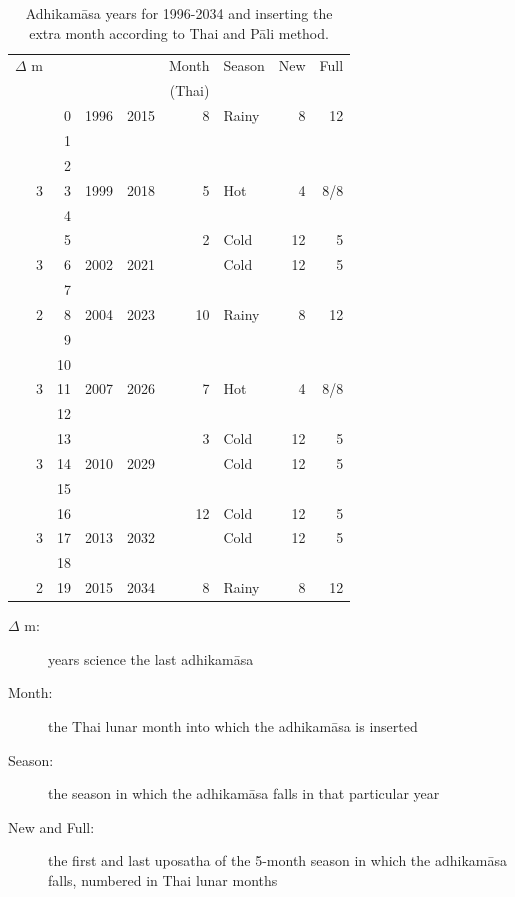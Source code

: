 \documentclass[11pt,oneside]{memoir-article}
\begin{document}
\begin{table}[p]
\caption{\label{tbl-cycle-adhikamasa} Adhikamāsa years for 1996-2034 and inserting the extra month according to Thai and Pāli method.}
\centering
\begin{tabular}{rrrr|rlrr}
$\Delta$ m &  &  &  & Month & Season & New & Full\\
 &  &  &  & (Thai) &  &  & \\
\hline
 & 0 & 1996 & 2015 & 8 & Rainy & 8 & 12\\
 & 1 &  &  &  &  &  & \\
 & 2 &  &  &  &  &  & \\
3 & 3 & 1999 & 2018 & 5 & Hot & 4 & 8/8\\
 & 4 &  &  &  &  &  & \\
 & 5 &  &  & 2 & Cold & 12 & 5\\
3 & 6 & 2002 & 2021 &  & Cold & 12 & 5\\
 & 7 &  &  &  &  &  & \\
2 & 8 & 2004 & 2023 & 10 & Rainy & 8 & 12\\
 & 9 &  &  &  &  &  & \\
 & 10 &  &  &  &  &  & \\
3 & 11 & 2007 & 2026 & 7 & Hot & 4 & 8/8\\
 & 12 &  &  &  &  &  & \\
 & 13 &  &  & 3 & Cold & 12 & 5\\
3 & 14 & 2010 & 2029 &  & Cold & 12 & 5\\
 & 15 &  &  &  &  &  & \\
 & 16 &  &  & 12 & Cold & 12 & 5\\
3 & 17 & 2013 & 2032 &  & Cold & 12 & 5\\
 & 18 &  &  &  &  &  & \\
2 & 19 & 2015 & 2034 & 8 & Rainy & 8 & 12\\
\end{tabular}
\end{table}

\begin{description}
\item[{$\Delta$ m:}] years science the last adhikamāsa
\item[{Month:}] the Thai lunar month into which the adhikamāsa is inserted
\item[{Season:}] the season in which the adhikamāsa falls in that
particular year
\item[{New and Full:}] the first and last uposatha of the 5-month season
in which the adhikamāsa falls, numbered in Thai
lunar months
\end{description}
\end{document}

